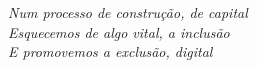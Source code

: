 \begin{epigrafe}[]
    \vspace*{\fill}
	\begin{flushright}
	
		\textit{Num processo de construção, de capital\\
				Esquecemos de algo vital, a inclusão\\
				E promovemos a exclusão, digital\\
				}
		
	\end{flushright}
\end{epigrafe}

